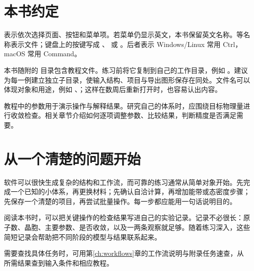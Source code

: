 \section{本书约定}
表示依次选择页面、按钮和菜单项。若菜单仍显示英文，本书保留英文名称。等名称表示文件；键盘上的按键写成 、 或 。后者表示 Windows/Linux 常用 Ctrl，macOS 常用 Command。

本书随附的  目录包含教程文件。练习前将它复制到自己的工作目录，例如 。建议为每一例建立独立子目录，使输入结构、项目与导出图形保存在同处。文件名可以体现对象和用途，例如 、；这样在数周后重新打开时，也容易认出内容。

教程中的参数用于演示操作与解释结果。研究自己的体系时，应围绕目标物理量进行收敛检查。相关章节介绍如何逐项调整参数、比较结果，判断精度是否满足需要。

\section{从一个清楚的问题开始}
软件可以很快生成复杂的结构和工作流，而可靠的练习通常从简单对象开始。先完成一个已知的小体系，再更换材料；先确认自洽计算，再增加能带或态密度步骤；先保存一个清楚的项目，再尝试批量操作。每一步都应能用一句话说明目的。

阅读本书时，可以把关键操作的检查结果写进自己的实验记录。记录不必很长：原子数、晶胞、主要参数、是否收敛，以及一两条观察就足够。随着练习深入，这些简短记录会帮助把不同阶段的模型与结果联系起来。


需要查找具体任务时，可用第\ref{ch:workflows}章的工作流说明与附录任务速查，从所需结果查到输入条件和相应教程。
